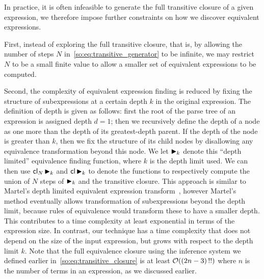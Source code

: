 In practice, it is often infeasible to generate the full transitive closure of
a given expression, we therefore impose further constraints on how we discover
equivalent expressions.

First, instead of exploring the full transitive closure, that is, by allowing
the number of steps $N$ in~\eqref{so:eq:transitive_generator} to be infinite,
we may restrict $N$ to be a small finite value to allow a smaller set of
equivalent expressions to be computed.

Second, the complexity of equivalent expression finding is reduced by fixing
the structure of subexpressions at a certain depth $k$ in the original
expression.  The definition of depth is given as follows: first the root of
the parse tree of an expression is assigned depth $d = 1$; then we recursively
define the depth of a node as one more than the depth of its greatest-depth
parent.  If the depth of the node is greater than $k$, then we fix the
structure of its child nodes by disallowing any equivalence transformation
beyond this node. We let $\operatorname{\blacktriangleright}_k$ denote this ``depth limited'' equivalence
finding function, where $k$ is the depth limit used.  We can then use
$\mathsf{cl}_N \operatorname{\blacktriangleright}_k$ and $\mathsf{cl} \operatorname{\blacktriangleright}_k$ to denote the functions to
respectively compute the union of $N$ steps of $\operatorname{\blacktriangleright}_k$ and the transitive
closure. This approach is similar to Martel's depth limited equivalent
expression transform~\cite{martel07}, however Martel's method eventually allows
transformation of subexpressions beyond the depth limit, because rules of
equivalence would transform these to have a smaller depth.  This contributes
to a time complexity at least exponential in terms of the expression size. In
contrast, our technique has a time complexity that does not depend on the size
of the input expression, but grows with respect to the depth limit $k$. Note
that the full equivalence closure using the inference system we defined earlier
in~\eqref{so:eq:transitive_closure} is at least $\operatorname{\mathcal{O}}((2n - 3)\,!!)$ where $n$
is the number of terms in an expression, as we discussed earlier.

